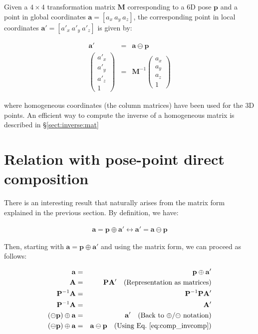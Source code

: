\documentclass[a4paper,11pt]{report}
\begin{document}
Given a $4\times 4$ transformation matrix $\mathbf{M}$ corresponding to a 6D pose 
$\mathbf{p}$ and a point in global coordinates 
$\mathbf{a} = [a_x ~ a_y ~ a_z]$, the corresponding point in local coordinates
$\mathbf{a'} = [a'_x ~ a'_y ~ a'_z]$ is given by:

\begin{eqnarray}
\mathbf{a'} &=& \mathbf{a} \ominus \mathbf{p} \nonumber \\
\left(\begin{array}{c}
 a'_x \\ a'_y \\ a'_z \\ 1
\end{array}\right)
&=&
\mathbf{M}^{-1} 
\left(\begin{array}{c}
 a_x \\ a_y \\ a_z \\ 1
\end{array}\right)
\end{eqnarray}

\noindent where homogeneous coordinates (the column matrices) have been used for the 3D points.
An efficient way to compute the inverse of a homogeneous matrix is 
described in \S \ref{sect:inverse:mat}


\section{Relation with pose-point direct composition}

There is an interesting result that naturally arises from the matrix form 
explained in the previous section.
By definition, we have:

\begin{eqnarray}
 \mathbf{a} = \mathbf{p} \oplus \mathbf{a'}   
\leftrightarrow
 \mathbf{a'} = \mathbf{a} \ominus \mathbf{p}
\label{eq:comp_invcomp}
\end{eqnarray}

Then, starting with $\mathbf{a} = \mathbf{p} \oplus \mathbf{a'}$
and using the matrix form, we can proceed as follows:

\begin{eqnarray*}
 \mathbf{a} &=& \mathbf{p} \oplus \mathbf{a'}    \\
 \mathbf{A} &=& \mathbf{P}  \mathbf{A'}  \quad \text{(Representation as matrices)}  \\
 \mathbf{P}^{-1} \mathbf{A} &=& \mathbf{P}^{-1} \mathbf{P}  \mathbf{A'} \\
 \mathbf{P}^{-1} \mathbf{A} &=& \mathbf{A'}  \\
 (\ominus \mathbf{p}) \oplus \mathbf{a} &=& \mathbf{a'}  \quad \text{(Back to $\oplus$/$\ominus$ notation)} \\
 (\ominus \mathbf{p}) \oplus \mathbf{a} &=& \mathbf{a} \ominus \mathbf{p}  \quad \text{(Using Eq.~\ref{eq:comp_invcomp})}
\end{eqnarray*}
\end{document}

